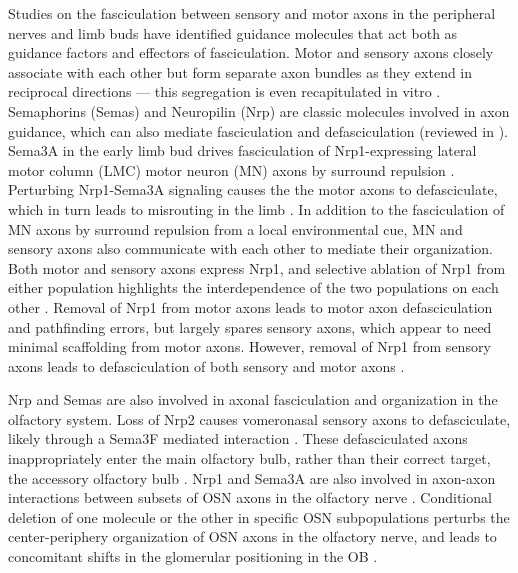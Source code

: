Studies on the fasciculation between sensory and motor axons in the peripheral nerves and limb buds have identified guidance molecules that act both as guidance factors and effectors of fasciculation.
Motor and sensory axons closely associate with each other but form separate axon bundles as they extend in reciprocal directions --- this segregation is even recapitulated in vitro \cite{gallarda2008segregation}.
Semaphorins (Semas) and Neuropilin (Nrp) are classic molecules involved in axon guidance, which can also mediate fasciculation and defasciculation (reviewed in ).
Sema3A in the early limb bud drives fasciculation of Nrp1-expressing lateral motor column (LMC) motor neuron (MN) axons by surround repulsion \cite{huber2005distinct}.
Perturbing Nrp1-Sema3A signaling causes the the motor axons to defasciculate, which in turn leads to misrouting in the limb \cite{huber2005distinct}.
In addition to the fasciculation of MN axons by surround repulsion from a local environmental cue, MN and sensory axons also communicate with each other to mediate their organization.
Both motor and sensory axons express Nrp1, and selective ablation of Nrp1 from either population highlights the interdependence of the two populations on each other \cite{huettl2011npn}.
Removal of Nrp1 from motor axons leads to motor axon defasciculation and pathfinding errors, but largely spares sensory axons, which appear to need minimal scaffolding from motor axons.
However, removal of Nrp1 from sensory axons leads to defasciculation of both sensory and motor axons \cite{huettl2011npn}.

Nrp and Semas are also involved in axonal fasciculation and organization in the olfactory system.
Loss of Nrp2 causes vomeronasal sensory axons to defasciculate, likely through a Sema3F mediated interaction \cite{cloutier2002neuropilin}.
These defasciculated axons inappropriately enter the main olfactory bulb, rather than their correct target, the accessory olfactory bulb \cite{cloutier2002neuropilin}.
Nrp1 and Sema3A are also involved in axon-axon interactions between subsets of OSN axons in the olfactory nerve \cite{imai2009pre}.
Conditional deletion of one molecule or the other in specific OSN subpopulations perturbs the center-periphery organization of OSN axons in the olfactory nerve, and leads to concomitant shifts in the glomerular positioning in the OB \cite{imai2009pre}.

